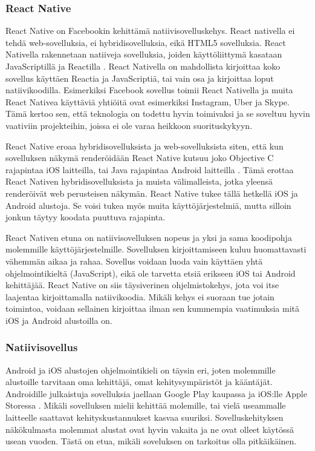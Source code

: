 \documentclass{tktltiki}
\begin{document}
\subsubsection{React Native}

React Native on Facebookin kehittämä natiivisovelluskehys. React nativella ei tehdä web-sovelluksia, ei hybridisovelluksia, eikä HTML5 sovelluksia. React Nativella rakennetaan natiiveja sovelluksia, joiden käyttöliittymä kasataan JavaScriptillä ja Reactilla \cite{Facebook}. React Nativella on mahdollista kirjoittaa koko sovellus käyttäen Reactia ja JavaScriptiä, tai vain osa ja kirjoittaa loput natiivikoodilla. Esimerkiksi Facebook sovellus toimii React Nativella ja muita React Nativea käyttäviä yhtiöitä ovat esimerkiksi Instagram, Uber ja Skype. Tämä kertoo sen, että teknologia on todettu hyvin toimivaksi ja se soveltuu hyvin vaativiin projekteihin, joissa ei ole varaa heikkoon suorituskykyyn.

React Native eroaa hybridisovelluksista ja web-sovelluksista siten, että kun sovelluksen näkymä renderöidään React Native kutsuu joko Objective C rajapintaa iOS laitteilla, tai Java rajapintaa Android laitteilla \cite{Aggarwal}. Tämä erottaa React Nativen hybridisovelluksista ja muista välimalleista, jotka yleensä renderöivät web perusteisen näkymän. React Native tukee tällä hetkellä iOS ja Android alustoja. Se voisi tukea myös muita käyttöjärjestelmiä, mutta silloin jonkun täytyy koodata puuttuva rajapinta.  

React Nativen etuna on natiivisovelluksen nopeus ja yksi ja sama koodipohja molemmille käyttöjärjestelmille. Sovelluksen kirjoittamiseen kuluu huomattavasti vähemmän aikaa ja rahaa. Sovellus voidaan luoda vain käyttäen yhtä ohjelmointikieltä (JavaScript), eikä ole tarvetta etsiä erikseen iOS tai Android kehittäjää. React Native on siis täysiverinen ohjelmistokehys, jota voi itse laajentaa kirjoittamalla natiivikoodia. Mikäli kehys ei suoraan tue jotain toimintoa, voidaan sellainen kirjoittaa ilman sen kummempia vaatimuksia mitä iOS ja Android alustoilla on.

\subsubsection{Natiivisovellus}

Android ja iOS alustojen ohjelmointikieli on täysin eri, joten molemmille alustoille tarvitaan oma kehittäjä, omat kehitysympäristöt ja kääntäjät. Androidille julkaistuja sovelluksia jaellaan Google Play kaupassa ja iOS:lle Apple Storessa \cite{Haikonen}. Mikäli sovelluksen mielii kehittää molemille, tai vielä useammalle laitteelle saattavat kehityskustannukset kasvaa suuriksi. Sovelluskehityksen näkökulmasta molemmat alustat ovat hyvin vakaita ja ne ovat olleet käytössä usean vuoden. Tästä on etua, mikäli soveluksen on tarkoitus olla pitkäikäinen.  
\end{document}
